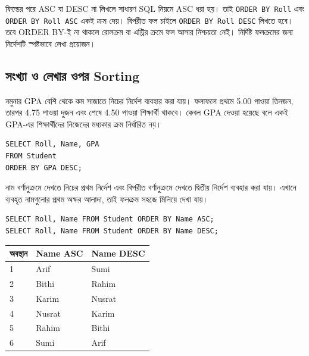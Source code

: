 ফিল্ডের পরে ASC বা DESC না লিখলে সাধারণ SQL নিয়মে ASC ধরা হয়। তাই \texttt{ORDER BY Roll} এবং \texttt{ORDER BY Roll ASC} একই ক্রম দেয়। বিপরীত ফল চাইলে \texttt{ORDER BY Roll DESC} লিখতে হবে। তবে ORDER BY-ই না থাকলে রোলক্রম বা এন্ট্রির ক্রমে ফল আসার নিশ্চয়তা নেই। নির্দিষ্ট ফলক্রমের জন্য নির্দেশটি স্পষ্টভাবে লেখা প্রয়োজন।

\subsection{সংখ্যা ও লেখার ওপর Sorting}
নমুনার GPA বেশি থেকে কম সাজাতে নিচের নির্দেশ ব্যবহার করা যায়। ফলাফলে প্রথমে 5.00 পাওয়া তিনজন, তারপর 4.75 পাওয়া দুজন এবং শেষে 4.50 পাওয়া শিক্ষার্থী থাকবে। কেবল GPA দেওয়া হয়েছে বলে একই GPA-এর শিক্ষার্থীদের নিজেদের মধ্যকার ক্রম নির্ধারিত নয়।
\begin{verbatim}
SELECT Roll, Name, GPA
FROM Student
ORDER BY GPA DESC;
\end{verbatim}
নাম বর্ণানুক্রমে দেখতে নিচের প্রথম নির্দেশ এবং বিপরীত বর্ণানুক্রমে দেখতে দ্বিতীয় নির্দেশ ব্যবহার করা যায়। এখানে ব্যবহৃত নামগুলোর প্রথম অক্ষর আলাদা, তাই ফলক্রম সহজে মিলিয়ে দেখা যায়।
\begin{verbatim}
SELECT Roll, Name FROM Student ORDER BY Name ASC;
SELECT Roll, Name FROM Student ORDER BY Name DESC;
\end{verbatim}
\begin{flushleft}\begin{minipage}{\linewidth}\raggedright\small
\begin{tabular}{|l|l|l|}\hline
অবস্থান & Name ASC & Name DESC\\\hline
1 & Arif & Sumi\\\hline2 & Bithi & Rahim\\\hline
3 & Karim & Nusrat\\\hline4 & Nusrat & Karim\\\hline
5 & Rahim & Bithi\\\hline6 & Sumi & Arif\\\hline
\end{tabular}
\end{minipage}\end{flushleft}


